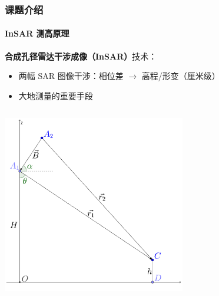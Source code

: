 \documentclass{beamer}
\begin{document}
\begin{frame}
    \frametitle{课题介绍}
    \framesubtitle{InSAR 测高原理}

    \textbf{合成孔径雷达干涉成像（InSAR）}技术：
    \begin{itemize}
        \small
        \setlength\itemsep{-0.1em}
        \item 两幅 SAR 图像干涉：相位差 $\to$ 高程/形变（厘米级）
        \item 大地测量的重要手段
    \end{itemize}
 
    \begin{columns}
        \begin{column}{0.5\textwidth}
            \centering

            \includegraphics[width=0.6\textwidth]{figures/insar_simple.pdf}


\end{column}
\end{columns}
\end{frame}
\end{document}
